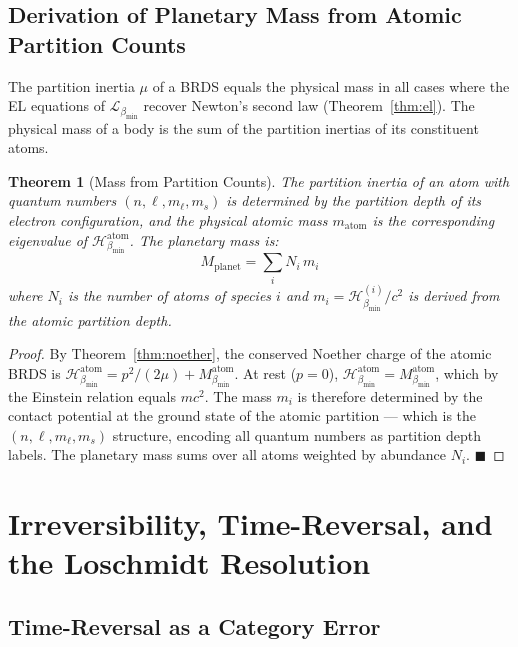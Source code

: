 \documentclass[12pt, a4paper]{article}
\theoremstyle{plain}
\newtheorem{theorem}{Theorem}[section]
\theoremstyle{definition}
\theoremstyle{remark}
\newcommand{\bmin}{\beta_{\min}}
\newcommand{\Lmin}{\mathcal{L}_{\bmin}}
\newcommand{\Hmin}{\mathcal{H}_{\bmin}}
\newcommand{\qed}{\hfill$\blacksquare$}
\begin{document}
\subsection{Derivation of Planetary Mass from Atomic Partition Counts}

The partition inertia $\mu$ of a BRDS equals the physical mass in all cases
where the EL equations of $\Lmin$ recover Newton's second law
(Theorem~\ref{thm:el}). The physical mass of a body is the sum of the partition
inertias of its constituent atoms.

\begin{theorem}[Mass from Partition Counts]
\label{thm:massfromcounts}
The partition inertia of an atom with quantum numbers $(n, \ell, m_\ell, m_s)$
is determined by the partition depth of its electron configuration, and the
physical atomic mass $m_{\mathrm{atom}}$ is the corresponding eigenvalue of
$\Hmin^{\mathrm{atom}}$. The planetary mass is:
\[
  M_{\mathrm{planet}} = \sum_{i} N_i\,m_i
\]
where $N_i$ is the number of atoms of species $i$ and $m_i = \Hmin^{(i)}/c^2$
is derived from the atomic partition depth.
\end{theorem}

\begin{proof}
By Theorem~\ref{thm:noether}, the conserved Noether charge of the atomic BRDS
is $\Hmin^{\mathrm{atom}} = p^2/(2\mu) + M_{\bmin}^{\mathrm{atom}}$. At rest
($p = 0$), $\Hmin^{\mathrm{atom}} = M_{\bmin}^{\mathrm{atom}}$, which by the
Einstein relation equals $mc^2$. The mass $m_i$ is therefore determined by the
contact potential at the ground state of the atomic partition --- which is the
$(n, \ell, m_\ell, m_s)$ structure, encoding all quantum numbers as partition
depth labels. The planetary mass sums over all atoms weighted by abundance $N_i$.
\qed
\end{proof}

\section{Irreversibility, Time-Reversal, and the Loschmidt Resolution}
\label{sec:loschmidt}

\subsection{Time-Reversal as a Category Error}
\end{document}
